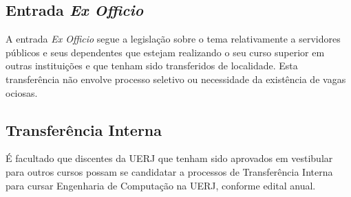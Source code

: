 \subsection{Entrada \textit{Ex Officio}}
A entrada \textit{Ex Officio} segue a legislação sobre o tema relativamente a servidores públicos e seus dependentes que estejam realizando o seu curso superior em outras instituições e que tenham sido transferidos de localidade. Esta transferência não envolve processo seletivo ou necessidade da existência de vagas ociosas.

\subsection{Transferência Interna}
É facultado que discentes da UERJ que tenham sido aprovados em vestibular para outros cursos possam se candidatar a processos de Transferência Interna para cursar Engenharia de Computação na UERJ, conforme edital anual.




